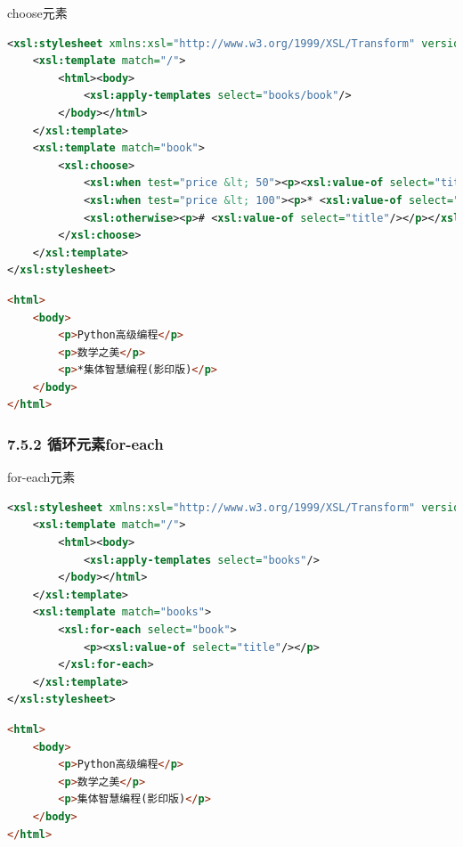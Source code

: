 \begin{frame}{choose元素}
\begin{lstlisting}[tabsize=8, basicstyle=\small\tt, language=XML, caption=样式文档]
<xsl:stylesheet xmlns:xsl="http://www.w3.org/1999/XSL/Transform" version="2.0">
    <xsl:template match="/">
        <html><body>
            <xsl:apply-templates select="books/book"/>
        </body></html>
    </xsl:template>
    <xsl:template match="book">
        <xsl:choose>
            <xsl:when test="price &lt; 50"><p><xsl:value-of select="title"/></p></xsl:when>
            <xsl:when test="price &lt; 100"><p>* <xsl:value-of select="title"/></p></xsl:when>
            <xsl:otherwise><p># <xsl:value-of select="title"/></p></xsl:otherwise>
        </xsl:choose>
    </xsl:template>
</xsl:stylesheet>
\end{lstlisting}

\begin{lstlisting}[tabsize=8, basicstyle=\small\tt, language=HTML, caption=转换结果]
<html>
    <body>
        <p>Python高级编程</p>
        <p>数学之美</p>
        <p>*集体智慧编程(影印版)</p>
    </body>
</html>
\end{lstlisting}
\end{frame}


\subsubsection{7.5.2 循环元素for-each}
\begin{frame}{for-each元素}
\begin{lstlisting}[tabsize=8, basicstyle=\small\tt, language=XML, caption=样式文档]
<xsl:stylesheet xmlns:xsl="http://www.w3.org/1999/XSL/Transform" version="2.0">
    <xsl:template match="/">
        <html><body>
            <xsl:apply-templates select="books"/>
        </body></html>
    </xsl:template>
    <xsl:template match="books">
        <xsl:for-each select="book">
            <p><xsl:value-of select="title"/></p>
        </xsl:for-each>
    </xsl:template>
</xsl:stylesheet>
\end{lstlisting}

\begin{lstlisting}[tabsize=8, basicstyle=\small\tt, language=HTML, caption=转换结果]
<html>
    <body>
        <p>Python高级编程</p>
        <p>数学之美</p>
        <p>集体智慧编程(影印版)</p>
    </body>
</html>
\end{lstlisting}
\end{frame}


